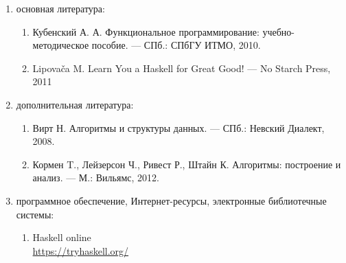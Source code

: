 \begin{enumerate}
\item основная литература:
	\begin{enumerate}
		\item \label{funk} Кубенский А. А. Функциональное программирование: учебно-методическое пособие. — СПб.: СПбГУ ИТМО, 2010. 
		\item Lipovača M. Learn You a Haskell for Great Good! --- No Starch Press, 2011

	\end{enumerate}
\item дополнительная литература:
	\begin{enumerate}[resume]
		\item \label{wirth} Вирт Н. Алгоритмы и структуры данных. — СПб.: Невский Диалект, 2008. 
		\item \label{kormen} Кормен T., Лейзерсон Ч., Ривест Р., Штайн К. Алгоритмы: построение и анализ. — М.: Вильямс, 2012.
	\end{enumerate}
\item программное обеспечение, Интернет-ресурсы, электронные библиотечные системы:
	\begin{enumerate}[resume]
		\item \label{haskell} Haskell online\\ \url{https://tryhaskell.org/}
	\end{enumerate}
\end{enumerate}





